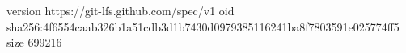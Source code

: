 version https://git-lfs.github.com/spec/v1
oid sha256:4f6554caab326b1a51cdb3d1b7430d0979385116241ba8f7803591e025774ff5
size 699216
